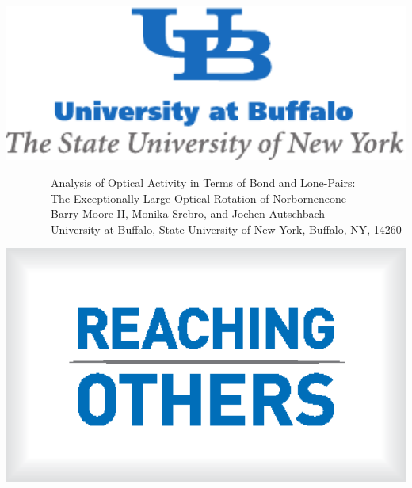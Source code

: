 \documentclass[landscape,a0b,final]{a0poster}
\newenvironment{poster}{
  \begin{center}
  \begin{minipage}[c]{0.98\textwidth}
}{
  \end{minipage} 
  \end{center}
}
\newenvironment{pcolumn}[1]{
  \begin{minipage}{#1\textwidth}
  \begin{center}
}{
  \end{center}
  \end{minipage}
}
\begin{document}
\begin{poster}
\begin{center}
\begin{pcolumn}{0.98}
{%
\begin{minipage}[c][9cm][c]{0.1\textwidth}
  \begin{center}
    \includegraphics[width=20cm,angle=0]{figures/ublogo}
  \end{center}
\end{minipage}
\begin{minipage}[c][9cm][c]{0.75\textwidth}
  \begin{center}
    {\sc \huge \ \ \ \ \ \ \ \ Analysis of Optical Activity in Terms of Bond and Lone-Pairs:}\\[5mm] 
    {\sc \huge \ \ \ \ \ \ \ \ The Exceptionally Large Optical Rotation of Norborneneone\cite{Autschbach:2012k}}\\[5mm]
    {\Large \ \ \ \ \ \ \ \ Barry Moore II, Monika Srebro, and Jochen Autschbach\\[7.5mm]
    \ \ \ \ \ \ \ \ University at Buffalo, State University of New York, Buffalo, NY, 14260}
  \end{center}
\end{minipage}
\begin{minipage}[c][9cm][c]{0.01\textwidth}
  \begin{center}
      \includegraphics[width=15cm,angle=0]{figures/ro}
  \end{center}
\end{minipage}

}
\end{pcolumn}
\end{center}
\end{poster}
\end{document}

